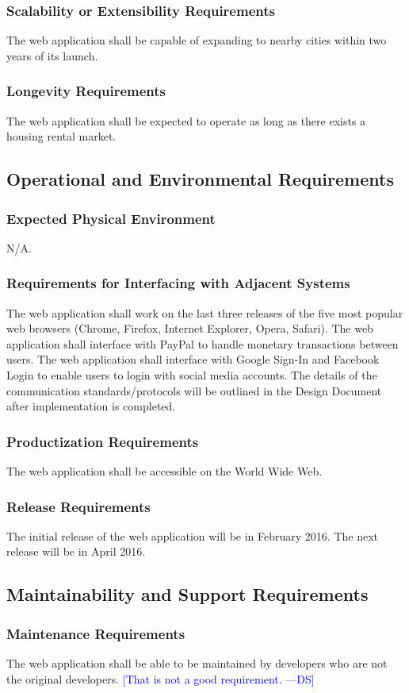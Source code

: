 \documentclass[12pt]{article}
\newcommand{\authornote}[3]{\textcolor{#1}{[#3 ---#2]}}
\newcommand{\authornote}[3]{}
\newcommand{\ds}[1]{\authornote{blue}{DS}{#1}}
\begin{document}
{\subsubsection{Scalability or Extensibility Requirements}
The web application shall be capable of expanding to nearby cities within two 
years of its launch.
\subsubsection{Longevity Requirements}
The web application shall be expected to operate as long as there exists a 
housing rental market.
\subsection{Operational and Environmental Requirements}
\subsubsection{Expected Physical Environment}
N/A.
\subsubsection{Requirements for Interfacing with Adjacent Systems}
The web application shall work on the last three releases of the five most 
popular web browsers (Chrome, Firefox, Internet Explorer, Opera, Safari). The 
web application shall interface with PayPal to handle monetary transactions 
between users. The web application shall interface with Google Sign-In and 
Facebook Login to enable users to login with social media accounts. The details 
of the communication standards/protocols will be outlined in the Design Document 
after implementation is completed.
\subsubsection{Productization Requirements}
The web application shall be accessible on the World Wide Web.
\subsubsection{Release Requirements}
The initial release of the web application will be in February 2016. The next 
release will be in April 2016.
\subsection{Maintainability and Support Requirements}
\subsubsection{Maintenance Requirements}
The web application shall be able to be maintained by developers who are not the 
original developers.
\ds{That is not a good requirement.}
}
\end{document}

